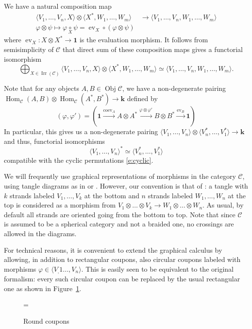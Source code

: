 \documentclass{amsart}
\theoremstyle{definition}
\theoremstyle{remark}
\numberwithin{equation}{section}
\newcommand{\firef}[1]{Figure~{\rm\ref{#1}}}
\newcommand{\cc}[1]{\underset{\scriptstyle #1}{\circ}}
\newcommand{\<}{\langle}
\renewcommand{\>}{\rangle}
\newcommand{\xxto}{\xrightarrow}              %
\newcommand{\one}{\mathbf{1}}
\newcommand{\kk}{\mathbf{k}}       %
\newcommand{\C}{\mathcal{C}}      %
\newcommand{\ph}{\varphi}
\DeclareMathOperator{\Irr}{Irr}
\DeclareMathOperator{\Hom}{Hom}
\DeclareMathOperator{\ev}{ev} %
\DeclareMathOperator{\coev}{coev} %
\DeclareMathOperator{\Obj}{Obj}
\begin{document}
We have a natural composition map 
\begin{equation}\label{e:composition}
\begin{aligned}
 \<V_1,\dots,V_n, X\>\otimes\<X^*, W_1,\dots,
W_m\>&\to\<V_1,\dots,V_n, W_1,\dots, W_m\>\\
\ph\otimes\psi\mapsto \ph\cc{X}\psi= \ev_X\circ (\ph\otimes\psi)
\end{aligned}
\end{equation}
where $\ev_X\colon X\otimes  X^*\to \one$ is the evaluation morphism. It
follows from semisimplicity of $\C$ that direct sum of these composition
maps gives a functorial isomorphism
\begin{equation}\label{e:gluing1}
 \bigoplus_{X\in \Irr(\C)} \<V_1,\dots,V_n, X\>\otimes\<X^*, W_1,\dots,
W_m\>\simeq\<V_1,\dots,V_n, W_1,\dots, W_m\>.
\end{equation}




Note that for any objects $A,B\in \Obj \C$, we have a 
non-degenerate pairing $\Hom_\C(A,B)\otimes \Hom_\C(A^*,B^*)\to \kk$ 
defined by 
\begin{equation}\label{e:pairing}
(\ph, \ph')=(\one\xxto{\coev_A}A\otimes A^*\xxto{\ph\otimes \ph'}
  B\otimes B^*\xxto{\ev_B}\one)
\end{equation}
In particular, this gives us a non-degenerate pairing 
$\<V_1,\dots,V_n\>\otimes \<V_n^*,\dots,V_1^*\>\to \kk$ and thus,
 functorial isomorphisms 
\begin{equation}\label{e:dual}
\<V_1,\dots,V_n\>^*\simeq \<V_n^*,\dots,V_1^*\>
\end{equation}
compatible with the cyclic permutations \eqref{e:cyclic}. 






We will frequently use graphical representations of morphisms in the
category $\C$, using tangle diagrams as in  or .
However, our convention is that of : a tangle with $k$ strands
labeled $V_1,\dots,V_k$ at the bottom and $n$ strands labeled $W_1,\dots,
W_n$ at the top is considered as a morphism from $V_1\otimes\dots\otimes
V_k\to W_1\otimes \dots\otimes W_n$. As usual, by default all strands are
oriented going from the bottom to top. Note that since $\C$ is assumed to
be a spherical category and not a braided one, no crossings are allowed in
the diagrams. 

For technical reasons, it is convenient to extend the graphical calculus by
allowing, in addition to rectangular coupons, also circular coupons
labeled with morphisms $\ph\in \<V_,1\dots, V_n\>$. This is easily seen to
be equivalent to the original formalism: every such circular coupon can be
replaced by the usual rectangular one as shown in \firef{f:round_coupon}.
\begin{figure}[ht]
\tzRoundCouponI
=
\tzRoundCouponII
\caption{Round coupons}\label{f:round_coupon}
\end{figure}
\end{document}
